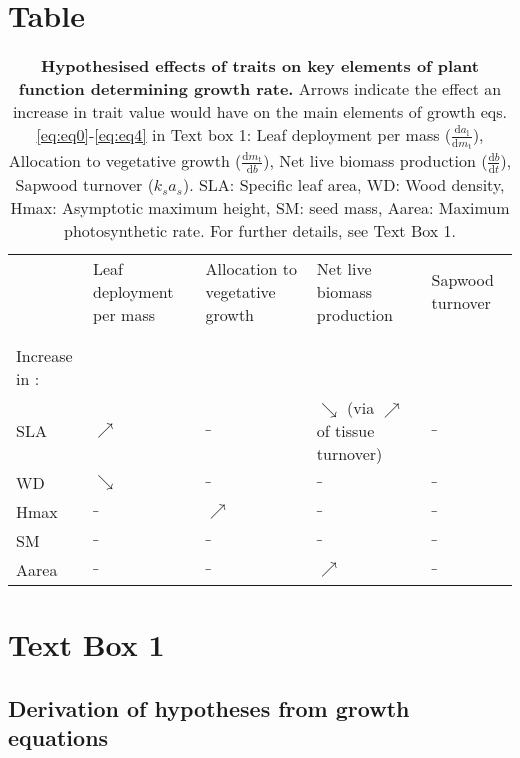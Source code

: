 \documentclass[a4paper]{article}\usepackage[]{graphicx}\usepackage[]{color}
\begin{document}
\newpage
\section*{Table} \label{sec:table}

\begin{table}[ht]
\centering
\caption{\textbf{ Hypothesised effects of traits on key elements of plant function determining growth rate.} Arrows indicate the effect an increase in trait value would have on the main elements of growth eqs. \ref{eq:eq0}-\ref{eq:eq4} in Text box 1:  Leaf deployment per mass ($\frac{\textrm{d}a_\textrm{l}}{\textrm{d}m_\textrm{t}}$), Allocation to vegetative growth ($\frac{\textrm{d}m_\textrm{t}}{\textrm{d}b}$), Net live biomass production ($\frac{\textrm{d}b}{\textrm{d}t}$), Sapwood turnover ($k_s a_s$). SLA: Specific leaf area, WD: Wood density, Hmax: Asymptotic maximum height, SM: seed mass, Aarea: Maximum photosynthetic rate. For further details, see Text Box 1.}
\vspace{1cm}
  \begin{tabular}{l p{3cm} p{2cm}p{4cm} p{2cm}}
  & Leaf deployment \newline per mass
  & Allocation to vegetative growth
  & Net live biomass \newline production
  & Sapwood turnover\\
  & & & &\\\hline
  & & & & \\
Increase in : & & & & \\ 
  SLA &$\nearrow$ &$\_$ & $\searrow$ \newline (via $\nearrow$ of tissue turnover) &$\_$ \\
  WD & $\searrow$ &$\_$  &$\_$ &$\_$ \\
  Hmax &$\_$ &$\nearrow$ &$\_$ &$\_$ \\
  SM &$\_$&$\_$&$\_$& $\_$\\ 
  Aarea &$\_$ &$\_$ & $\nearrow$ &$\_$ \\

\hline
  \end{tabular}
\label{tab:trade-offs}
\end{table}



\newpage
\section*{Text Box 1} \label{sec:growth}

\subsection*{Derivation of hypotheses from growth equations} 
\end{document}
